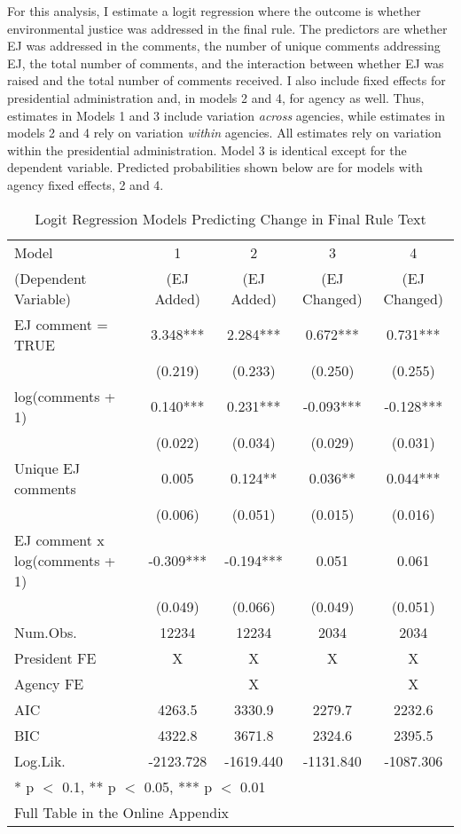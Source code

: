 \documentclass[
      12pt,
        ]{article}
\begin{document}
For this analysis, I estimate a logit regression where the outcome is whether environmental justice was addressed in the final rule. The predictors are
whether EJ was addressed in the comments, the number of unique comments addressing EJ, the total number of comments, and the interaction between whether EJ was raised and the total number of comments received. I also include fixed effects for presidential administration and, in models 2 and 4, for agency as well. Thus, estimates in Models 1 and 3 include variation \emph{across} agencies, while estimates in models 2 and 4 rely on variation \emph{within} agencies. All estimates rely on variation within the presidential administration.
Model 3 is identical except for the dependent variable. Predicted probabilities shown below are for models with agency fixed effects, 2 and 4.

\begin{table}[H]
\centering
\caption{\label{tab:tables}Logit Regression Models Predicting Change in Final Rule Text}

\begin{tabular}[t]{lcccc}
\toprule
Model  & 1 & 2 & 3 & 4\\
(Dependent Variable)  & (EJ Added) & (EJ Added) & (EJ Changed) & (EJ Changed)\\
\midrule
EJ comment = TRUE & 3.348*** & 2.284*** & 0.672*** & 0.731***\\
 & (0.219) & (0.233) & (0.250) & (0.255)\\
log(comments + 1) & 0.140*** & 0.231*** & -0.093*** & -0.128***\\
 & (0.022) & (0.034) & (0.029) & (0.031)\\
Unique EJ comments & 0.005 & 0.124** & 0.036** & 0.044***\\
 & (0.006) & (0.051) & (0.015) & (0.016)\\
EJ comment x log(comments + 1) & -0.309*** & -0.194*** & 0.051 & 0.061\\
 & (0.049) & (0.066) & (0.049) & (0.051)\\
\midrule
Num.Obs. & 12234 & 12234 & 2034 & 2034\\
President FE & X & X & X & X\\
Agency FE &  & X &  & X\\
AIC & 4263.5 & 3330.9 & 2279.7 & 2232.6\\
BIC & 4322.8 & 3671.8 & 2324.6 & 2395.5\\
Log.Lik. & -2123.728 & -1619.440 & -1131.840 & -1087.306\\
\bottomrule
\multicolumn{5}{l}{\textsuperscript{} * p $<$ 0.1, ** p $<$ 0.05, *** p $<$ 0.01}\\
\multicolumn{5}{l}{\textsuperscript{} Full Table in the Online Appendix}\\
\end{tabular}
\end{table}
\end{document}
